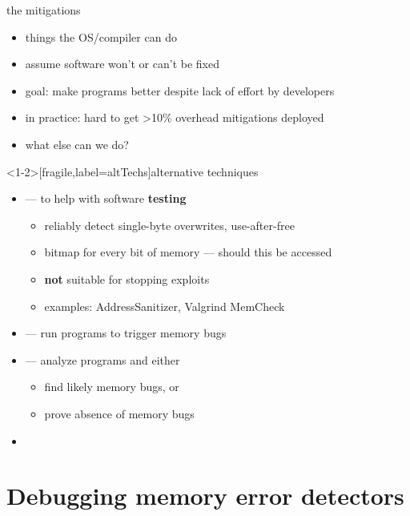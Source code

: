 \begin{frame}{the mitigations}
    \begin{itemize}
        \item things the OS/compiler can do
        \item assume software won't or can't be fixed
        \item goal: make programs better despite lack of effort by developers
        \item in practice: hard to get >10\% overhead mitigations deployed
        \vspace{.5cm}
    \item what else can we do?
    \end{itemize}
\end{frame}

\begin{frame}<1-2>[fragile,label=altTechs]{alternative techniques}
    \begin{itemize}
        \item {} --- to help with software \textbf{testing}
            \begin{itemize}
            \item reliably detect single-byte overwrites, use-after-free
            \item bitmap for every bit of memory --- should this be accessed
            \item \textbf{not} suitable for stopping exploits
            \item examples: AddressSanitizer, Valgrind MemCheck
            \end{itemize}
        \item {} --- run programs to trigger memory bugs
        \item {} --- analyze programs and either
            \begin{itemize}
            \item find likely memory bugs, or
            \item prove absence of memory bugs
            \end{itemize}
        \item {}
    \end{itemize}
\end{frame}

\section{Debugging memory error detectors}


